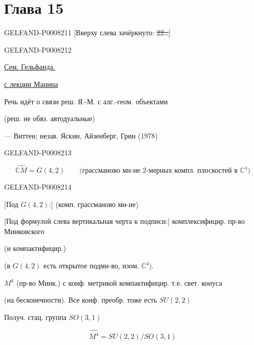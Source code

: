 \section*{Глава 15}
\begin{GelfandAdjacentEvidence}{GELFAND-P000821}{1}
[Вверху слева зачёркнуто: \sout{22…}]
\end{GelfandAdjacentEvidence}
\begin{GelfandAdjacentEvidence}{GELFAND-P000821}{2}


 \qquad \uline{Сем. Гельфанда.}

 \quad \uline{с лекции Манина}

Речь идёт о связи реш. Я.-М. с алг.-геом. объектами

(реш. не обяз. автодуальные)

— Виттен; незав. Яскин, Айзенберг, Грин (1978)
\end{GelfandAdjacentEvidence}
\begin{GelfandAdjacentEvidence}{GELFAND-P000821}{3}


\[
\widehat{\mathbb{C}M}=G(4,2)\qquad
\text{(грассманово мн-ие 2-мерных компл. плоскостей в \(\mathbb{C}^4\))}
\]
\end{GelfandAdjacentEvidence}
\begin{GelfandAdjacentEvidence}{GELFAND-P000821}{4}


[Под \(G(4,2)\):] (комп. грассманово мн-ие)

[Под формулой слева вертикальная черта к подписи:] комплексифицир. пр-во Минковского

(и компактифицир.)

(в \(G(4,2)\) есть открытое подмн-во, изом. \(\mathbb{C}^4\)).


\(M^4\) (пр-во Минк.) с конф. метрикой компактифицир. т.е. свет. конуса

(на бесконечности). Все конф. преобр. тоже есть \(SU(2,2)\)

Получ. стац. группа \(SO(3,1)\)

\begin{equation*}
\widehat{M^4}=SU(2,2)/SO(3,1)\tag{1}
\end{equation*}
\end{GelfandAdjacentEvidence}
